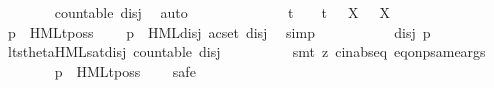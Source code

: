 \begin{isabellebody}
\ \ \ \ \ \ \isamarkupfalse%
\ {\isacartoucheopen}countable\ {\isacharquery}{\kern0pt}disj{\isacartoucheclose}\ \isamarkupfalse%
\ auto\isanewline
\ \ \ \ \ \ \isamarkupfalse%
\ {\isacartoucheopen}{\isasymalpha}\ {\isasymnoteq}\ {\isasymtau}\ {\isasymand}\ {\isasymalpha}\ {\isasymnoteq}\ t\ {\isasymand}\ {\isasymalpha}\ {\isasymnoteq}\ t{\isacharunderscore}{\kern0pt}{\isasymepsilon}\ {\isasymand}\ {\isacharparenleft}{\kern0pt}{\isasymforall}\ X{\isachardot}{\kern0pt}\ {\isasymalpha}\ {\isasymnoteq}\ {\isasymepsilon}{\isacharbrackleft}{\kern0pt}X{\isacharbrackright}{\kern0pt}{\isacharparenright}{\kern0pt}{\isacartoucheclose}\isanewline
\ \ \ \ \ \ \isamarkupfalse%
\ {\isacartoucheopen}{\isasymtheta}{\isacharparenleft}{\kern0pt}p{\isacharparenright}{\kern0pt}\ {\isasymTurnstile}\ {\isasymsigma}{\isacharparenleft}{\kern0pt}HMLt{\isacharunderscore}{\kern0pt}poss\ {\isasymalpha}\ {\isasymphi}{\isacharparenright}{\kern0pt}{\isacartoucheclose}\ \isamarkupfalse%
\ {\isacartoucheopen}{\isasymtheta}{\isacharparenleft}{\kern0pt}p{\isacharparenright}{\kern0pt}\ {\isasymTurnstile}\ HML{\isacharunderscore}{\kern0pt}disj\ {\isacharparenleft}{\kern0pt}acset\ {\isacharquery}{\kern0pt}disj{\isacharparenright}{\kern0pt}{\isacartoucheclose}\ \isamarkupfalse%
\ simp\isanewline
\ \ \ \ \ \ \isamarkupfalse%
\ {\isacartoucheopen}{\isasymexists}\ {\isasymphi}{\isacharprime}{\kern0pt}\ {\isasymin}\ {\isacharquery}{\kern0pt}disj{\isachardot}{\kern0pt}\ {\isasymtheta}{\isacharparenleft}{\kern0pt}p{\isacharparenright}{\kern0pt}\ {\isasymTurnstile}\ {\isasymphi}{\isacharprime}{\kern0pt}{\isacartoucheclose}\ \isamarkupfalse%
\ lts{\isacharunderscore}{\kern0pt}theta{\isachardot}{\kern0pt}HML{\isacharunderscore}{\kern0pt}sat{\isacharunderscore}{\kern0pt}disj\ {\isacartoucheopen}countable\ {\isacharquery}{\kern0pt}disj{\isacartoucheclose}\isanewline
\ \ \ \ \ \ \ \ \isamarkupfalse%
\ {\isacharparenleft}{\kern0pt}smt\ {\isacharparenleft}{\kern0pt}z{}{\isacharparenright}{\kern0pt}\ cin{\isachardot}{\kern0pt}abs{\isacharunderscore}{\kern0pt}eq\ eq{\isacharunderscore}{\kern0pt}onp{\isacharunderscore}{\kern0pt}same{\isacharunderscore}{\kern0pt}args{\isacharparenright}{\kern0pt}\isanewline
\ \ \ \ \ \ \isamarkupfalse%
\ {\isacartoucheopen}p\ {\isasymTTurnstile}\ HMLt{\isacharunderscore}{\kern0pt}poss\ {\isasymalpha}\ {\isasymphi}{\isacartoucheclose}\ \isamarkupfalse%
\ safe\isanewline
\ \ \ \ \ \ \ \ \isamarkupfalse%

\end{isabellebody}
